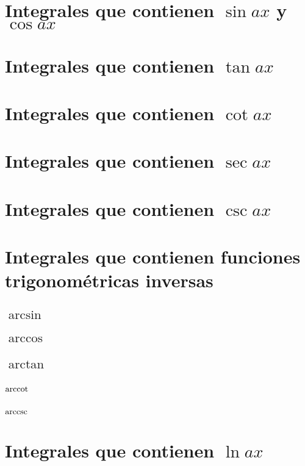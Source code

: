 \section{Integrales que contienen $\sin ax$ y $\cos ax$}

\section{Integrales que contienen $\tan ax$}

\section{Integrales que contienen $\cot ax$}

\section{Integrales que contienen $\sec ax$}

\section{Integrales que contienen $\csc ax$}

\section{Integrales que contienen funciones trigonométricas inversas}
\subsection{$\arcsin $}
\subsection{$\arccos $}
\subsection{$\arctan $}
\subsection{$\operatorname{arccot} $}
\subsection{$\operatorname{arccsc} $}

\section{Integrales que contienen $\ln ax$}

